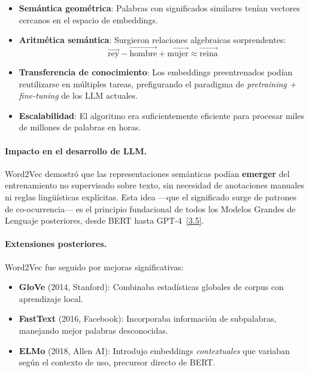 \documentclass[12pt,a4paper]{report}
\numberwithin{figure}{section}
\begin{document}
\begin{itemize}
    \item \textbf{Semántica geométrica}: Palabras con significados similares tenían vectores cercanos en el espacio de embeddings.
    
    \item \textbf{Aritmética semántica}: Surgieron relaciones algebraicas sorprendentes:
    \begin{equation}
    \vec{\text{rey}} - \vec{\text{hombre}} + \vec{\text{mujer}} \approx \vec{\text{reina}}
    \end{equation}
    
    \item \textbf{Transferencia de conocimiento}: Los embeddings preentrenados podían reutilizarse en múltiples tareas, prefigurando el paradigma de \textit{pretraining + fine-tuning} de los LLM actuales.
    
    \item \textbf{Escalabilidad}: El algoritmo era suficientemente eficiente para procesar miles de millones de palabras en horas.
\end{itemize}

\paragraph{Impacto en el desarrollo de LLM.}
Word2Vec demostró que las representaciones semánticas podían \textbf{emerger} del entrenamiento no supervisado sobre texto, sin necesidad de anotaciones manuales ni reglas lingüísticas explícitas. Esta idea ---que el significado surge de patrones de co-ocurrencia--- es el principio fundacional de todos los Modelos Grandes de Lenguaje posteriores, desde BERT hasta GPT-4~\hyperref[ref:3]{[3.5]}.

\paragraph{Extensiones posteriores.}
Word2Vec fue seguido por mejoras significativas:
\begin{itemize}
    \item \textbf{GloVe} (2014, Stanford): Combinaba estadísticas globales de corpus con aprendizaje local.
    \item \textbf{FastText} (2016, Facebook): Incorporaba información de subpalabras, manejando mejor palabras desconocidas.
    \item \textbf{ELMo} (2018, Allen AI): Introdujo embeddings \textit{contextuales} que variaban según el contexto de uso, precursor directo de BERT.
\end{itemize}
\end{document}
